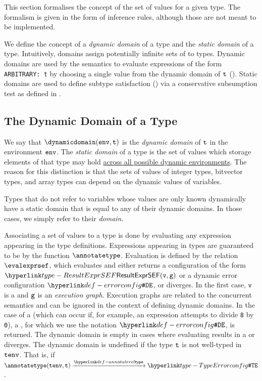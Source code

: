 This section formalises the concept of the set of values for a given type.
The formalism is given in the form of inference rules, although those are not meant
to be implemented.

We define the concept of a \emph{dynamic domain} of a type
and the \emph{static domain} of a type.
Intuitively, domains assign potentially infinite sets of \nativevaluesterm{} to types.
Dynamic domains are used by the semantics to evaluate expressions of the form \texttt{ARBITRARY: t}
by choosing a single value from the dynamic domain of $\texttt{t}$ ().
Static domains are used to define subtype satisfaction ()
via a conservative subsumption test as defined in .

\subsection{The Dynamic Domain of a Type\label{sec:DynDomain}}
%
We say that $\dynamicdomain(\env, \vt)$ is the \emph{dynamic domain} of $\texttt{t}$
in the environment $\texttt{env}$.
%
The \emph{static domain} of a type is the set of values which storage elements of that type may hold
\underline{across all possible dynamic environments}.
%
The reason for this distinction is that the sets of values
of integer types, bitvector types, and array types can depend on the dynamic values of variables.

Types that do not refer to variables whose values are only known dynamically have
a static domain that is equal to any of their dynamic domains.
In those cases, we simply refer to their \emph{domain}.

Associating a set of values to a type is done by evaluating any expression appearing
in the type definitions.
%
Expressions appearing in types are guaranteed to be \sideeffectfreeterm{} by the
function $\annotatetype$.
%
Evaluation is defined by the relation $\evalexprsef\empty$,
which evaluates \sideeffectfreeexpressionsterm{} and either returns
a configuration of the form $\ResultExprSEF(\vv,\vg)$ or a dynamic error configuration $\DynErrorConfig$,
or diverges.
In the first case, $\texttt{v}$ is a \nativevalueterm{} and $\texttt{g}$
is an \emph{execution graph}. Execution graphs are related to the concurrent semantics
and can be ignored in the context of defining dynamic domains.
In the case of a \dynamicerrorterm{} (which can occur if, for example, an expression attempts to divide
\texttt{8} by \texttt{0}), a \DynamicErrorConfigurationTerm{}, for which we use the notation
$\DynErrorConfig$, is returned.
%
The dynamic domain is empty in cases where evaluating \sideeffectfreeexpressionsterm{}
results in a \DynamicErrorConfigurationTerm{} or diverges.
%
The dynamic domain is undefined if the type $\texttt{t}$ is not well-typed in $\texttt{tenv}$.
That is, if $\annotatetype(\tenv, \vt) \typearrow \TypeErrorConfig$.


